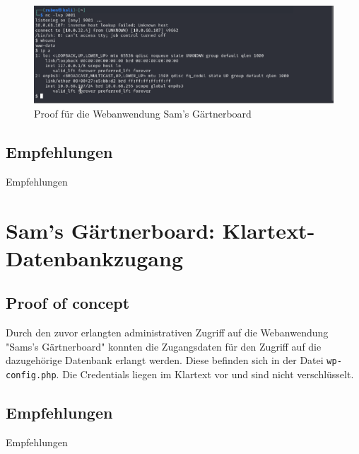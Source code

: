 \begin{figure}[!ht]
    \centering
    \includegraphics[width=\linewidth]{images/proofs/03_sam_proof.png}
    \caption{Proof für die Webanwendung Sam's Gärtnerboard}
    \label{fig:03_sam_proof}
\end{figure}

\subsection*{Empfehlungen}
Empfehlungen


\section{\makecvssbadge Sam's Gärtnerboard: Klartext-Datenbankzugang}

\subsection*{Proof of concept}
Durch den zuvor erlangten administrativen Zugriff auf die Webanwendung "Sams's Gärtnerboard" konnten die Zugangsdaten für den Zugriff auf die dazugehörige Datenbank erlangt werden. Diese befinden sich in der Datei \texttt{wp-config.php}. Die Credentials liegen im Klartext vor und sind nicht verschlüsselt.

\subsection*{Empfehlungen}
Empfehlungen



